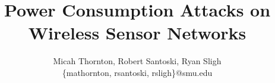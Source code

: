 \title{Power Consumption Attacks on Wireless Sensor Networks}
\author{Micah Thornton, Robert Santoski, Ryan Sligh\\ \small{\{mathornton, rsantoski, rsligh\}@smu.edu}}
\maketitle
